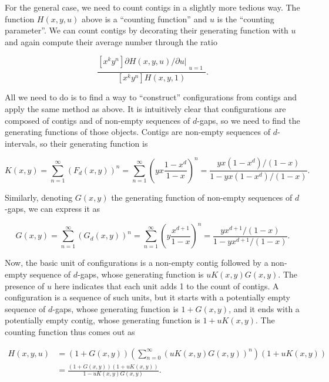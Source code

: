 \documentclass{article}
\begin{document}
For the general case, we need to count contigs in a slightly more tedious
way. The function $H(x,y,u)$ above is a ``counting function'' and $u$ is
the ``counting parameter''. We can count contigs by decorating their
generating function with $u$ and again compute their average number
through the ratio

\begin{equation*}
\frac{[x^ky^n] \partial H(x,y,u)/\partial u|_{\substack{\\u=1}}}
{[x^ky^n]H(x,y,1)}.
\end{equation*}

All we need to do is to find a way to ``construct'' configurations from
contigs and apply the same method as above. It is intuitively clear that
configurations are composed of contigs and of non-empty sequences of
$d$-gaps, so we need to find the generating functions of those objects.
Contigs are non-empty sequences of $d$-intervals, so their generating
function is

\begin{equation*}
K(x,y) = \sum_{n=1}^\infty \left( F_d(x,y) \right)^n
= \sum_{n=1}^\infty \left(yx\frac{1-x^d}{1-x} \right)^n
= \frac{yx(1-x^d)/(1-x)}{1-yx(1-x^d)/(1-x)}.
\end{equation*}

Similarly, denoting $G(x,y)$ the generating function of non-empty
sequences of $d$-gaps, we can express it as

\begin{equation*}
G(x,y) = \sum_{n=1}^\infty \left(G_d(x,y) \right)^n
= \sum_{n=1}^\infty \left(y\frac{x^{d+1}}{1-x} \right)^n
= \frac{yx^{d+1}/(1-x)}{1-yx^{d+1}/(1-x)}.
\end{equation*}

Now, the basic unit of configurations is a non-empty contig followed by a
non-empty sequence of $d$-gaps, whose generating function is
$uK(x,y)G(x,y)$. The presence of $u$ here indicates that each unit adds 1
to the count of contigs. A configuration is a sequence of such units, but
it starts with a potentially empty sequence of $d$-gaps, whose generating
function is $1+G(x,y)$, and it ends with a potentially empty contig, whose
generating function is $1+uK(x,y)$. The counting function thus comes out
as

\begin{equation*}
\begin{split}
H(x,y,u) &= \left( 1+G(x,y) \right)
\left( \sum_{n=0}^\infty (uK(x,y)G(x,y))^n \right)
\left( 1+uK(x,y) \right) \\
& = \frac{(1+G(x,y))(1+uK(x,y))}{1-uK(x,y)G(x,y)}.
\end{split}
\end{equation*}
\end{document}
